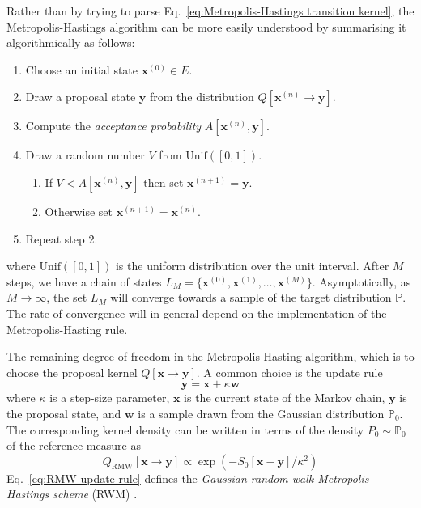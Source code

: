 Rather than by trying to parse Eq.~\ref{eq:Metropolis-Hastings transition kernel}, the Metropolis-Hastings algorithm can be more easily understood by summarising it algorithmically as follows:
\begin{enumerate}
\item Choose an initial state $\mathbf{x}^{(0)} \in E$.
\item Draw a proposal state $\mathbf{y}$ from the distribution $Q[\mathbf{x}^{(n)} \to \mathbf{y}]$.	
\item Compute the \textit{acceptance probability} $A[\mathbf{x}^{(n)}, \mathbf{y}]$.
\item Draw a random number $V$ from $\text{Unif}([0,1])$.
	\begin{enumerate}
	\item If $V < A[\mathbf{x}^{(n)}, \mathbf{y}]$ then set $\mathbf{x}^{(n+1)} = \mathbf{y}$.
	\item Otherwise set  $\mathbf{x}^{(n+1)} = \mathbf{x}^{(n)}$.
	\end{enumerate}
\item Repeat step 2.
\end{enumerate}
where $\text{Unif}([0,1])$ is the uniform distribution over the unit interval. After $M$ steps, we have a chain of states $L_M = \{ \mathbf{x}^{(0)}, \mathbf{x}^{(1)}, \dots, \mathbf{x}^{(M)} \}$. Asymptotically, as $M \to \infty$, the set $L_M$ will converge towards a sample of the target distribution $\mathbb{P}$. The rate of convergence will in general depend on the implementation of the Metropolis-Hasting rule.

The remaining degree of freedom in the Metropolis-Hasting algorithm, which is to choose the proposal kernel $Q[\mathbf{x} \to \mathbf{y}]$. A common choice is the update rule
\begin{equation} \label{eq:RMW update rule}
	\mathbf{y} = \mathbf{x} + \kappa \mathbf{w}
\end{equation}
where $\kappa$ is a step-size parameter, $\mathbf{x}$ is the current state of the Markov chain, $\mathbf{y}$ is the proposal state, and $\mathbf{w}$ is a sample drawn from the Gaussian distribution $\mathbb{P}_0$. The corresponding kernel density can be written in terms of the density $P_0 \sim \mathbb{P}_0$ of the reference measure as
\begin{equation} \label{eq:RMW transition kernel}
	Q_\text{RMW}[\mathbf{x} \to \mathbf{y}] \propto \exp ( - S_0[\mathbf{x} - \mathbf{y}] / \kappa^2 ) 
\end{equation}
Eq.~\ref{eq:RMW update rule} defines the \textit{Gaussian random-walk Metropolis-Hastings scheme} (RWM) \citep{metropolisEquationStateCalculations1953, hastingsMonteCarloSampling1970}.


